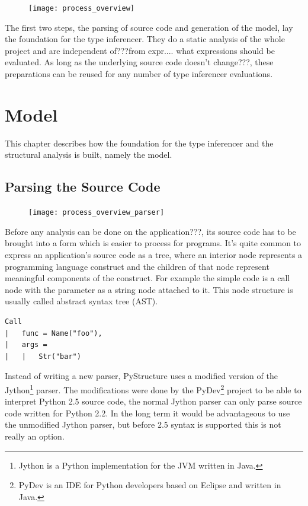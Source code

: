 \documentclass[12pt,halfparskip,DIV11,BCOR10mm]{scrreprt}
\begin{document}
\begin{figure}[h!]
 \centering
 \texttt{[image: process\_overview]}
 \label{fig:process_overview}
\end{figure}

The first two steps, the parsing of source code and generation of the model, lay the foundation for the type inferencer. They do a static analysis of the whole project and are independent of???from expr.... what expressions should be evaluated. As long as the underlying source code doesn't change???, these preparations can be reused for any number of type inferencer evaluations.

\chapter{Model}

This chapter describes how the foundation for the type inferencer and the structural analysis is built, namely the model.

\section{Parsing the Source Code}

\begin{figure}
    \vspace{-0.6cm}
    \texttt{[image: process\_overview\_parser]}
\end{figure}

Before any analysis can be done on the application???, its source code has to be brought into a form which is easier to process for programs. It's quite common to express an application's source code as a tree, where an interior node represents a programming language construct and the children of that node represent meaningful components of the construct. For example the simple code  is a call node with the parameter as a string node attached to it. This node structure is usually called abstract syntax tree (AST).

\begin{lstlisting}
Call
|   func = Name("foo"),
|   args = 
|   |   Str("bar")
\end{lstlisting}

Instead of writing a new parser, PyStructure uses a modified version of the Jython\footnote{Jython is a Python implementation for the JVM written in Java.} parser. The modifications were done by the PyDev\footnote{PyDev is an IDE for Python developers based on Eclipse and written in Java.} project to be able to interpret Python 2.5 source code, the normal Jython parser can only parse source code written for Python 2.2. In the long term it would be advantageous to use the unmodified Jython parser, but before 2.5 syntax is supported this is not really an option.
\end{document}
